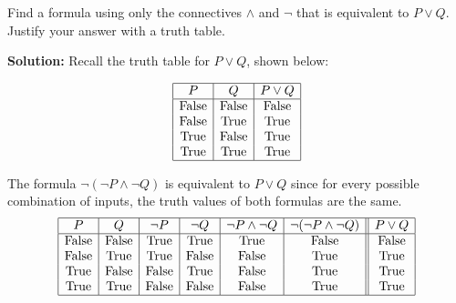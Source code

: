 Find a formula using only the connectives $\wedge$ and $\neg$ that is equivalent to $P \vee Q$. Justify your answer with a truth table. 

\textbf{Solution:} Recall the truth table for $P \vee Q$, shown below:

\[
\begin{array}{|c|c|c|}
\hline
P & Q & P \vee Q \\
\hline
\text{False} & \text{False} & \text{False} \\
\text{False} & \text{True} & \text{True} \\
\text{True} & \text{False} & \text{True} \\
\text{True} & \text{True} & \text{True} \\
\hline
\end{array}
\]

The formula $\neg (\neg P \wedge \neg Q)$ is equivalent to $P \vee Q$ since for every possible combination of inputs, the truth values of both formulas are the same. 
\[
\begin{array}{|c|c|c|c|c|c||c|}
\hline
P & Q & \neg P & \neg Q & \neg P \wedge \neg Q & \neg (\neg P \wedge \neg Q) & P \vee Q \\
\hline
\text{False} & \text{False} & \text{True} & \text{True} & \text{True} & \text{False} & \text{False}\\
\text{False} & \text{True} & \text{True} & \text{False} & \text{False} & \text{True} & \text{True}\\
\text{True} & \text{False} & \text{False} & \text{True} & \text{False} & \text{True} & \text{True}\\
\text{True} & \text{True} & \text{False} & \text{False} & \text{False} & \text{True} & \text{True}\\
\hline
\end{array}
\]

\pagebreak